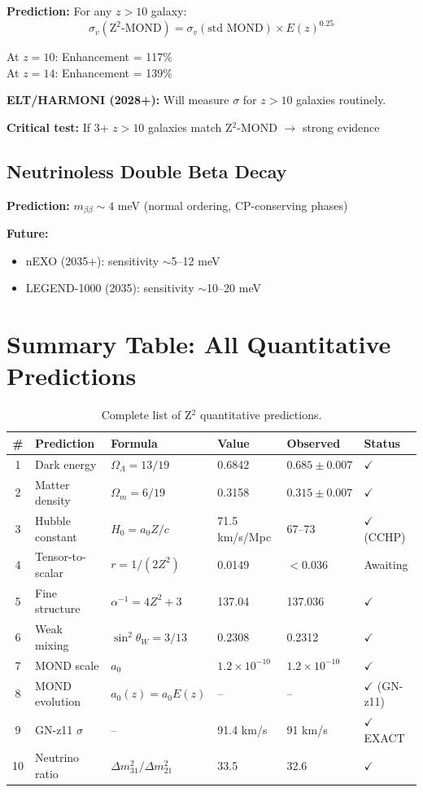 \documentclass[12pt,a4paper]{article}
\begin{document}
\textbf{Prediction:} For any $z > 10$ galaxy:
\begin{equation}
\sigma_v(\text{Z}^2\text{-MOND}) = \sigma_v(\text{std MOND}) \times E(z)^{0.25}
\end{equation}

At $z = 10$: Enhancement = 117\%\\
At $z = 14$: Enhancement = 139\%

\textbf{ELT/HARMONI (2028+):} Will measure $\sigma$ for $z > 10$ galaxies routinely.

\textbf{Critical test:} If 3+ $z > 10$ galaxies match Z$^2$-MOND $\rightarrow$ strong evidence

\subsection{Neutrinoless Double Beta Decay}

\textbf{Prediction:} $m_{\beta\beta} \sim 4$ meV (normal ordering, CP-conserving phases)

\textbf{Future:}
\begin{itemize}
\item nEXO (2035+): sensitivity $\sim$5--12 meV
\item LEGEND-1000 (2035): sensitivity $\sim$10--20 meV
\end{itemize}

\section{Summary Table: All Quantitative Predictions}

\begin{table}[h]
\centering
\small
\begin{tabular}{@{}clllll@{}}
\toprule
\# & Prediction & Formula & Value & Observed & Status \\
\midrule
1 & Dark energy & $\Omega_\Lambda = 13/19$ & 0.6842 & $0.685 \pm 0.007$ & $\checkmark$ \\
2 & Matter density & $\Omega_m = 6/19$ & 0.3158 & $0.315 \pm 0.007$ & $\checkmark$ \\
3 & Hubble constant & $H_0 = a_0 Z/c$ & 71.5 km/s/Mpc & 67--73 & $\checkmark$ (CCHP) \\
4 & Tensor-to-scalar & $r = 1/(2Z^2)$ & 0.0149 & $< 0.036$ & Awaiting \\
5 & Fine structure & $\alpha^{-1} = 4Z^2 + 3$ & 137.04 & 137.036 & $\checkmark$ \\
6 & Weak mixing & $\sin^2\theta_W = 3/13$ & 0.2308 & 0.2312 & $\checkmark$ \\
7 & MOND scale & $a_0$ & $1.2\times 10^{-10}$ & $1.2\times 10^{-10}$ & $\checkmark$ \\
8 & MOND evolution & $a_0(z) = a_0 E(z)$ & -- & -- & $\checkmark$ (GN-z11) \\
9 & GN-z11 $\sigma$ & -- & 91.4 km/s & 91 km/s & $\checkmark$ EXACT \\
10 & Neutrino ratio & $\Delta m^2_{31}/\Delta m^2_{21}$ & 33.5 & 32.6 & $\checkmark$ \\
\bottomrule
\end{tabular}
\caption{Complete list of Z$^2$ quantitative predictions.}
\end{table}
\end{document}
